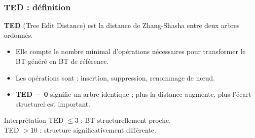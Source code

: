 \documentclass[aspectratio=169]{beamer}
\begin{document}
\begin{frame}
  \frametitle{TED : définition}

  \small
  \textbf{TED} (Tree Edit Distance) est la distance de Zhang-Shasha entre deux arbres ordonnés.

  \vspace{0.5em}
  \begin{itemize}
    \item Elle compte le nombre minimal d'opérations nécessaires pour transformer le BT généré en BT de référence.
    \item Les opérations sont : insertion, suppression, renommage de nœud.
    \item \textbf{TED = 0} signifie un arbre identique ; plus la distance augmente, plus l'écart structurel est important.
  \end{itemize}

  \vspace{0.5em}
  \begin{exampleblock}{Interprétation}
    \small
    TED $\leq 3$ : BT structurellement proche.\\
    TED $> 10$ : structure significativement différente.
  \end{exampleblock}
\end{frame}
\end{document}
